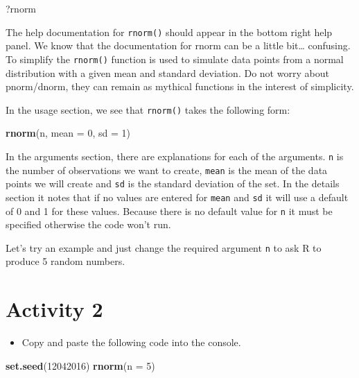 \documentclass[
]{book}
\newenvironment{Shaded}{\begin{snugshade}}{\end{snugshade}}
\newcommand{\AttributeTok}[1]{\textcolor[rgb]{0.13,0.29,0.53}{#1}}
\newcommand{\DecValTok}[1]{\textcolor[rgb]{0.00,0.00,0.81}{#1}}
\newcommand{\FunctionTok}[1]{\textcolor[rgb]{0.13,0.29,0.53}{\textbf{#1}}}
\newcommand{\NormalTok}[1]{#1}
\providecommand{\tightlist}{%
  \setlength{\itemsep}{0pt}\setlength{\parskip}{0pt}}
\begin{document}
\begin{Shaded}
\begin{Highlighting}[]
\NormalTok{?rnorm}
\end{Highlighting}
\end{Shaded}

The help documentation for \texttt{rnorm()} should appear in the bottom right help panel. We know that the documentation for rnorm can be a little bit\ldots{} confusing. To simplify the \texttt{rnorm()} function is used to simulate data points from a normal distribution with a given mean and standard deviation. Do not worry about pnorm/dnorm, they can remain as mythical functions in the interest of simplicity.

In the usage section, we see that \texttt{rnorm()} takes the following form:

\begin{Shaded}
\begin{Highlighting}[]
\FunctionTok{rnorm}\NormalTok{(n, }\AttributeTok{mean =} \DecValTok{0}\NormalTok{, }\AttributeTok{sd =} \DecValTok{1}\NormalTok{)}
\end{Highlighting}
\end{Shaded}

In the arguments section, there are explanations for each of the arguments. \texttt{n} is the number of observations we want to create, \texttt{mean} is the mean of the data points we will create and \texttt{sd} is the standard deviation of the set. In the details section it notes that if no values are entered for \texttt{mean} and \texttt{sd} it will use a default of 0 and 1 for these values. Because there is no default value for \texttt{n} it must be specified otherwise the code won't run.

Let's try an example and just change the required argument \texttt{n} to ask R to produce 5 random numbers.

\section{Activity 2}\label{activity-2}

\begin{itemize}
\tightlist
\item
  Copy and paste the following code into the console.
\end{itemize}

\begin{Shaded}
\begin{Highlighting}[]
\FunctionTok{set.seed}\NormalTok{(}\DecValTok{12042016}\NormalTok{)}
\FunctionTok{rnorm}\NormalTok{(}\AttributeTok{n =} \DecValTok{5}\NormalTok{)}
\end{Highlighting}
\end{Shaded}
\end{document}
